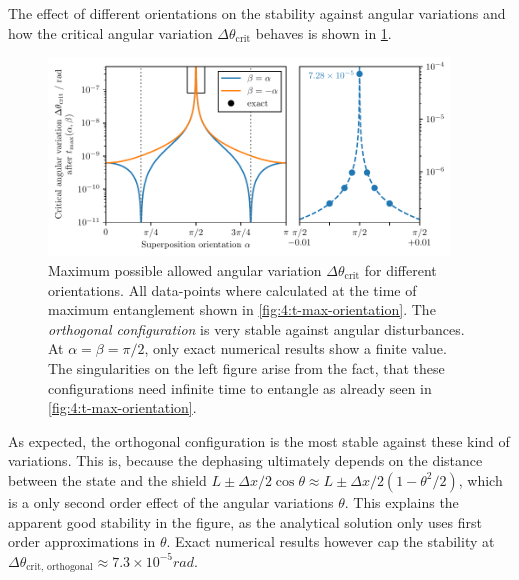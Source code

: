 The effect of different orientations on the stability against angular variations and how the critical angular variation $\Delta \theta_\mathrm{crit}$ behaves is shown in \cref{fig:4:theta-crit-orientation}.
\begin{figure}[!htbp]
  \centering
  \includegraphics[width=0.95\textwidth]{./../figures/theta-variance/theta-crit-orientation-complete.pdf}
  \caption{Maximum possible allowed angular variation $\Delta\theta_\mathrm{crit}$ for different orientations. All data-points where calculated at the time of maximum entanglement shown in \cref{fig:4:t-max-orientation}. The \emph{orthogonal configuration} is very stable against angular disturbances. At $\alpha=\beta=\pi/2$, only exact numerical results show a finite value. The singularities on the left figure arise from the fact, that these configurations need infinite time to entangle as already seen in \cref{fig:4:t-max-orientation}.}
  \label{fig:4:theta-crit-orientation}
\end{figure}
As expected, the orthogonal configuration is the most stable against these kind of variations. This is, because the dephasing ultimately depends on the distance between the state and the shield $L \pm \Delta x/2 \cos\theta \approx L \pm \Delta x/2 (1 - \theta^2/2)$, which is a only second order effect of the angular variations $\theta$.
This explains the apparent  good stability in the figure, as the analytical solution only uses first order approximations in $\theta$.
Exact numerical results however cap the stability at $\Delta \theta_\mathrm{crit,\,orthogonal} \approx 7.3\times 10^{-5}\si{rad}$.

